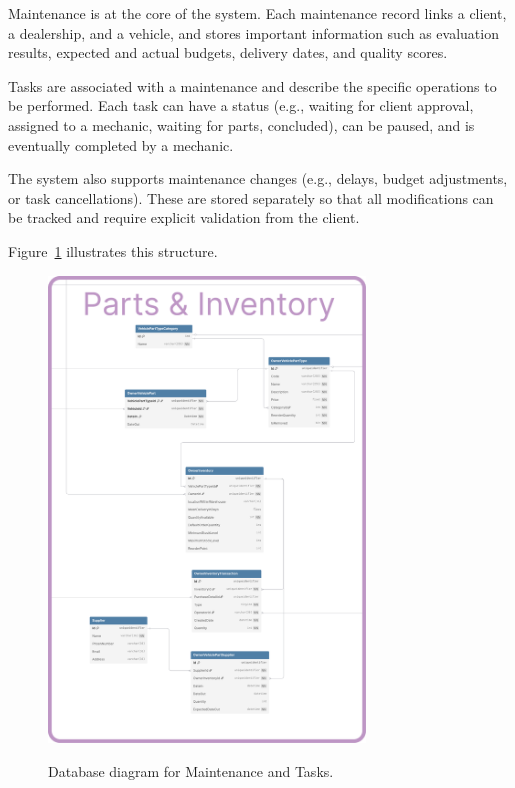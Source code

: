 Maintenance is at the core of the system. Each maintenance record links a client, a dealership, and a vehicle, and stores important information such as evaluation results, expected and actual budgets, delivery dates, and quality scores.

Tasks are associated with a maintenance and describe the specific operations to be performed. Each task can have a status (e.g., waiting for client approval, assigned to a mechanic, waiting for parts, concluded), can be paused, and is eventually completed by a mechanic.

The system also supports maintenance changes (e.g., delays, budget adjustments, or task cancellations). These are stored separately so that all modifications can be tracked and require explicit validation from the client.

Figure~\ref{fig:dbMaintenance} illustrates this structure.

\begin{figure}[h]
  \caption{Database diagram for Maintenance and Tasks.}
  \centering
  \includegraphics[width=0.75\textwidth]{figs/dbDiagrams/Maintenance_and_Tasks}
  \label{fig:dbMaintenance}
\end{figure}



